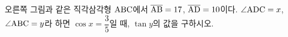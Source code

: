 \noindent\begin{minipage}[t]{0.58\linewidth}\vspace{0pt}\raggedright 오른쪽 그림과 같은 직각삼각형 $\mathrm{ABC}$에서 $\overline{\mathrm{AB}}=17$, $\overline{\mathrm{AD}}=10$이다. $\angle\mathrm{ADC}=x$, $\angle\mathrm{ABC}=y$라 하면 $\cos x=\dfrac{3}{5}$일 때, $\tan y$의 값을 구하시오.\end{minipage}\hfill\begin{minipage}[t]{0.4\linewidth}\vspace{0pt}\centering \resizebox{\ifdim\width>\linewidth\linewidth\else\width\fi}{!}{}\end{minipage}\par
